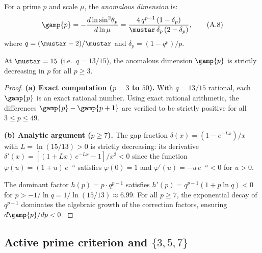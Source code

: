 \documentclass[12pt,a4paper]{article}
\begin{document}
\begin{derivedbox}
For a prime $p$ and scale $\mu$, the \emph{anomalous dimension} is:
\begin{equation}
  \gamp{p} = -\frac{d \ln \sin^2\!\theta_p}{d \ln \mu}
  = \frac{4\,q^{p-1}\,(1 - \delta_p)}{\mustar\,\delta_p\,(2 - \delta_p)},
  \tag{A.8}
\end{equation}
where $q = (\mustar - 2)/\mustar$ and $\delta_p = (1 - q^p)/p$.
\end{derivedbox}

\begin{theorembox}
At $\mustar = 15$ (i.e.\ $q = 13/15$), the anomalous dimension
$\gamp{p}$ is strictly decreasing in $p$ for all $p \geq 3$.

\begin{proof}
\textbf{(a) Exact computation ($p = 3$ to $50$).}
With $q = 13/15$ rational, each $\gamp{p}$ is an exact rational
number. Using exact rational arithmetic, the differences
$\gamp{p} - \gamp{p+1}$ are verified to be strictly positive for all
$3 \leq p \leq 49$.

\textbf{(b) Analytic argument ($p \geq 7$).}
The gap fraction $\delta(x) = (1 - e^{-Lx})/x$ with
$L = \ln(15/13) > 0$ is strictly decreasing: its derivative
$\delta'(x) = [(1 + Lx)\,e^{-Lx} - 1]/x^2 < 0$ since the function
$\varphi(u) = (1+u)\,e^{-u}$ satisfies $\varphi(0) = 1$ and
$\varphi'(u) = -u\,e^{-u} < 0$ for $u > 0$.

The dominant factor $h(p) = p \cdot q^{p-1}$ satisfies
$h'(p) = q^{p-1}(1 + p\ln q) < 0$ for
$p > -1/\ln q = 1/\ln(15/13) \approx 6.99$. For all $p \geq 7$,
the exponential decay of $q^{p-1}$ dominates the algebraic growth of
the correction factors, ensuring $d\gamp{p}/dp < 0$.
\end{proof}
\end{theorembox}

\subsection{Active prime criterion and $\{3,5,7\}$}
\label{app:active}
\end{document}

